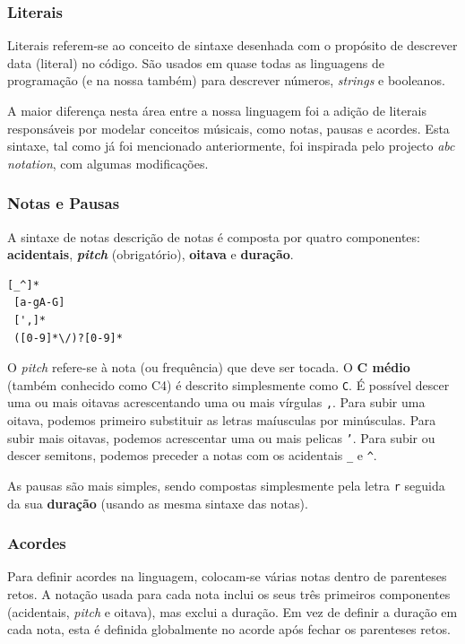 \documentclass[
  oneside,
  11pt, a4paper,
  footinclude=true,
  headinclude=true,
  cleardoublepage=empty
]{scrbook}
\begin{document}
	\subsubsection{\textbf{Literais}}
	Literais referem-se ao conceito de sintaxe desenhada com o propósito de descrever data (literal) no código. São usados em quase todas as linguagens de programação (e na nossa também) para descrever números, \textit{strings} e booleanos.
	
	A maior diferença nesta área entre a nossa linguagem foi a adição de literais responsáveis por modelar conceitos músicais, como notas, pausas e acordes. Esta sintaxe, tal como já foi mencionado anteriormente, foi inspirada pelo projecto \textit{abc notation}, com algumas modificações.
	
	\subsubsection{\textbf{Notas e Pausas}}
	A sintaxe de notas descrição de notas é composta por quatro componentes: \textbf{acidentais}, \textbf{\textit{pitch}} (obrigatório), \textbf{oitava} e \textbf{duração}.
	
\begin{center}
\begin{lstlisting}[backgroundcolor=\color{transparent},captionpos=b,caption=Expressão regular que identifica uma nota (quebras de linha apenas para claridade de leitura),xleftmargin=.4\textwidth]
 [_^]*
 [a-gA-G]
 [',]*
 ([0-9]*\/)?[0-9]*
\end{lstlisting}
\end{center}
	
	O \textit{pitch} refere-se à nota (ou frequência) que deve ser tocada. O \textbf{C médio} (também conhecido como C4) é descrito simplesmente como \texttt{C}. É possível descer uma ou mais oitavas acrescentando uma ou mais vírgulas \texttt{,}. Para subir uma oitava, podemos primeiro substituir as letras maíusculas por minúsculas. Para subir mais oitavas, podemos acrescentar uma ou mais pelicas \texttt{'}. Para subir ou descer semitons, podemos preceder a notas com os acidentais \texttt{\_} e \texttt{\^}.
	
	As pausas são mais simples, sendo compostas simplesmente pela letra \texttt{r} seguida da sua \textbf{duração} (usando as mesma sintaxe das notas).
	
	\subsubsection{\textbf{Acordes}}
	Para definir acordes na linguagem, colocam-se várias notas dentro de parenteses retos. A notação usada para cada nota inclui os seus três primeiros componentes (acidentais, \textit{pitch} e oitava), mas exclui a duração. Em vez de definir a duração em cada nota, esta é definida globalmente no acorde após fechar os parenteses retos.
	
\end{document}
